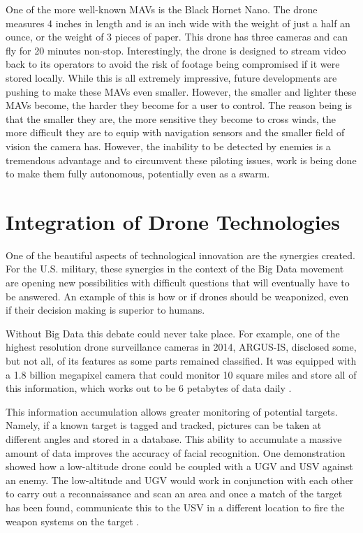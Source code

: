 \documentclass[sigconf]{acmart}
\begin{document}
One of the more well-known MAVs is the Black Hornet Nano. The drone measures 4 inches in length and is an inch wide with the weight of just a half an ounce, or the weight of 3 pieces of paper. This drone has three cameras and can fly for 20 minutes non-stop. Interestingly, the drone is designed to stream video back to its operators to avoid the risk of footage being compromised if it were stored locally. While this is all extremely impressive, future developments are pushing to make these MAVs even smaller. However, the smaller and lighter these MAVs become, the harder they become for a user to control. The reason being is that the smaller they are, the more sensitive they become to cross winds, the more difficult they are to equip with navigation sensors and the smaller field of vision the camera has. However, the inability to be detected by enemies is a tremendous advantage and to circumvent these piloting issues, work is being done to make them fully autonomous, potentially even as a swarm. 

\section{Integration of Drone Technologies}

One of the beautiful aspects of technological innovation are the synergies created. For the U.S. military, these synergies in the context of the Big Data movement are opening new possibilities with difficult questions that will eventually have to be answered. An example of this is how or if drones should be weaponized, even if their decision making is superior to humans. 

Without Big Data this debate could never take place. For example, one of the highest resolution drone surveillance cameras in 2014, ARGUS-IS, disclosed some, but not all, of its features as some parts remained classified. It was equipped with a 1.8 billion megapixel camera that could monitor 10 square miles and store all of this information, which works out to be 6 petabytes of data daily \cite{argus}. 

This information accumulation allows greater monitoring of potential targets. Namely, if a known target is tagged and tracked, pictures can be taken at different angles and stored in a database. This ability to accumulate a massive amount of data improves the accuracy of facial recognition. One demonstration showed how a low-altitude drone could be coupled with a UGV and USV against an enemy. The low-altitude and UGV would work in conjunction with each other to carry out a reconnaissance and scan an area and once a match of the target has been found, communicate this to the USV in a different location to fire the weapon systems on the target \cite{60minutes}. 
\end{document}
